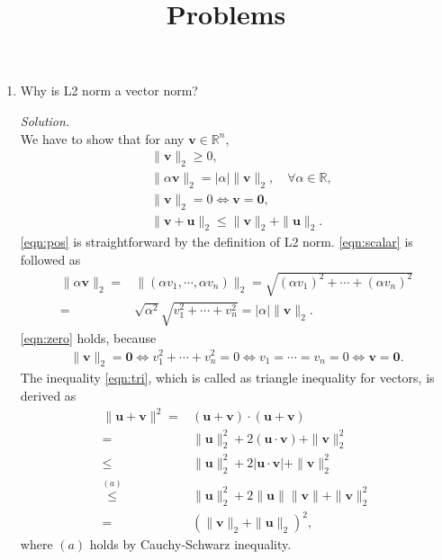 \documentclass{article}
\title{Problems}
\begin{document}
\maketitle
\begin{enumerate}

\item Why is L2 norm a vector norm?

\emph{Solution.}\\

We have to show that for any $\mathbf{v}\in\mathbb{R}^n$,
	\begin{align}
	&\|\mathbf{v}\|_2\geq 0,\label{eqn:pos}\\
	&\|\alpha \mathbf{v}\|_2=|\alpha|\|\mathbf{v}\|_2,\quad\forall\alpha\in\mathbb{R},\label{eqn:scalar}\\
	&\|\mathbf{v}\|_2=0 \iff \mathbf{v}=\mathbf{0},\label{eqn:zero}\\
	&\|\mathbf{v}+\mathbf{u}\|_2\leq \|\mathbf{v}\|_2+\|\mathbf{u}\|_2.\label{eqn:tri}
	\end{align}
\eqref{eqn:pos} is straightforward by the definition of L2 norm.
\eqref{eqn:scalar} is followed as
	\begin{align}
	\|\alpha \mathbf{v}\|_2=&\|(\alpha v_1,\cdots,\alpha v_n)\|_2
	=\sqrt{(\alpha v_1)^2+\cdots+(\alpha v_n)^2}\\
	=&\sqrt{\alpha^2}\sqrt{v_1^2+\cdots+v_n^2}	=|\alpha| \|\mathbf{v}\|_2.
	\end{align}
\eqref{eqn:zero} holds, because
	\begin{align*}
	\|\mathbf{v}\|_2=\mathbf{0} \iff v_1^2+\cdots+v_n^2=0 \iff v_1=\cdots=v_n=0 \iff \mathbf{v}=\mathbf{0}.	
	\end{align*}
The inequality \eqref{eqn:tri}, which is called as triangle inequality for vectors, is derived as
	\begin{align*}
	\|\mathbf{u}+\mathbf{v}\|^2=&(\mathbf{u}+\mathbf{v})	\cdot (\mathbf{u}+\mathbf{v})\\
	=& \|\mathbf{u}\|_2^2 +2(\mathbf{u}\cdot\mathbf{v})+\|\mathbf{v}\|_2^2\\
	\leq & \|\mathbf{u}\|_2^2 +2|\mathbf{u}\cdot\mathbf{v}|+\|\mathbf{v}\|_2^2 \\
	\stackrel{(a)}{\leq}& \|\mathbf{u}\|_2^2 +2\|\mathbf{u}\|\|\mathbf{v}\|+\|\mathbf{v}\|_2^2\\
	=&(\|\mathbf{v}\|_2+\|\mathbf{u}\|_2)^2,
	\end{align*}
where $(a)$ holds by Cauchy-Schwarz inequality.


\end{enumerate}
\end{document}
